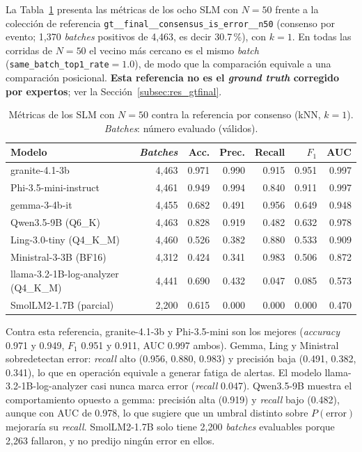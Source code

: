 La Tabla~\ref{tab:res_n50} presenta las métricas de los ocho SLM con $N=50$ frente a la colección de referencia \texttt{gt\_\_final\_\_consensus\_is\_error\_\_n50} (consenso por evento; 1{,}370 \textit{batches} positivos de 4{,}463, es decir 30.7\,\%), con $k=1$. En todas las corridas de $N=50$ el vecino más cercano es el mismo \textit{batch} (\texttt{same\_batch\_top1\_rate}$=1.0$), de modo que la comparación equivale a una comparación posicional. \textbf{Esta referencia no es el \textit{ground truth} corregido por expertos}; ver la Sección~\ref{subsec:res_gtfinal}.

\begin{table}[H]
\centering
\caption{Métricas de los SLM con $N=50$ contra la referencia por consenso (kNN, $k=1$). \textit{Batches}: número evaluado (válidos).}
\label{tab:res_n50}
\small
\begin{tabular}{@{}lrrrrrr@{}}
\toprule
\textbf{Modelo} & \textbf{\textit{Batches}} & \textbf{Acc.} & \textbf{Prec.} & \textbf{Recall} & \textbf{$F_1$} & \textbf{AUC} \\
\midrule
granite-4.1-3b & 4{,}463 & 0.971 & 0.990 & 0.915 & 0.951 & 0.997 \\
Phi-3.5-mini-instruct & 4{,}461 & 0.949 & 0.994 & 0.840 & 0.911 & 0.997 \\
gemma-3-4b-it & 4{,}455 & 0.682 & 0.491 & 0.956 & 0.649 & 0.948 \\
Qwen3.5-9B (Q6\_K) & 4{,}463 & 0.828 & 0.919 & 0.482 & 0.632 & 0.978 \\
Ling-3.0-tiny (Q4\_K\_M) & 4{,}460 & 0.526 & 0.382 & 0.880 & 0.533 & 0.909 \\
Ministral-3-3B (BF16) & 4{,}312 & 0.424 & 0.341 & 0.983 & 0.506 & 0.872 \\
llama-3.2-1B-log-analyzer (Q4\_K\_M) & 4{,}441 & 0.690 & 0.432 & 0.047 & 0.085 & 0.573 \\
SmolLM2-1.7B (parcial) & 2{,}200 & 0.615 & 0.000 & 0.000 & 0.000 & 0.470 \\
\bottomrule
\end{tabular}
\normalsize
\end{table}


Contra esta referencia, granite-4.1-3b y Phi-3.5-mini son los mejores (\textit{accuracy} 0.971 y 0.949, $F_1$ 0.951 y 0.911, AUC 0.997 ambos). Gemma, Ling y Ministral sobredetectan error: \textit{recall} alto (0.956, 0.880, 0.983) y precisión baja (0.491, 0.382, 0.341), lo que en operación equivale a generar fatiga de alertas. El modelo llama-3.2-1B-log-analyzer casi nunca marca error (\textit{recall} 0.047). Qwen3.5-9B muestra el comportamiento opuesto a gemma: precisión alta (0.919) y \textit{recall} bajo (0.482), aunque con AUC de 0.978, lo que sugiere que un umbral distinto sobre $P(\text{error})$ mejoraría su \textit{recall}. SmolLM2-1.7B solo tiene 2{,}200 \textit{batches} evaluables porque 2{,}263 fallaron, y no predijo ningún error en ellos.

